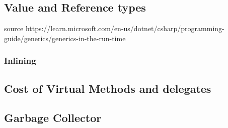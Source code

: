 \subsection{Value and Reference types}



source
https://learn.microsoft.com/en-us/dotnet/csharp/programming-guide/generics/generics-in-the-run-time



\subsubsection{Inlining}



\subsection{Cost of Virtual Methods and delegates}

\subsection{Garbage Collector}